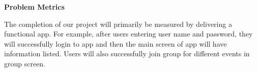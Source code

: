 \documentclass[10pt,letterpaper]{article}
\begin{document}
\begin{center}
\large
\textbf{Problem Metrics}
\end{center}

The completion of our project will primarily be measured by delivering a functional app. For example, after users entering user name and password, they will successfully login to app and then the main screen of app will have information listed. Users will also successfully join group for different events in group screen. 
\end{document}
